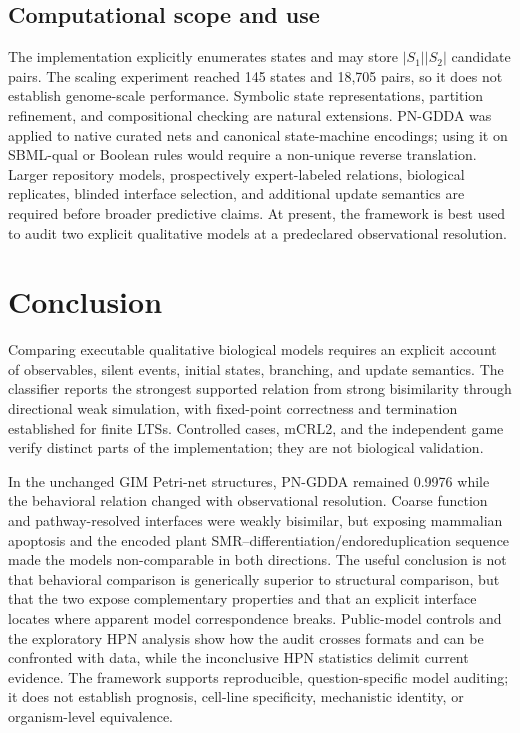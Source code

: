 \documentclass{ws-jbcb}
\numberwithin{equation}{section}
\begin{document}
\subsection{Computational scope and use}
\label{sec:discussion-computation}

The implementation explicitly enumerates states and may store
$|S_1||S_2|$ candidate pairs. The scaling experiment reached 145 states and
18,705 pairs, so it does not establish genome-scale performance. Symbolic state
representations, partition refinement, and compositional checking are natural
extensions. PN-GDDA was applied to native curated nets and canonical
state-machine encodings; using it on SBML-qual or Boolean rules would require a
non-unique reverse translation. Larger repository models, prospectively
expert-labeled relations, biological replicates, blinded interface selection,
and additional update semantics are required before broader predictive claims.
At present, the framework is best used to audit two explicit qualitative models
at a predeclared observational resolution.

\section{Conclusion}\label{sec:conclusion}

Comparing executable qualitative biological models requires an explicit account
of observables, silent events, initial states, branching, and update semantics.
The classifier reports the strongest supported relation from strong
bisimilarity through directional weak simulation, with fixed-point correctness
and termination established for finite LTSs. Controlled cases, mCRL2, and the
independent game verify distinct parts of the implementation; they are not
biological validation.

In the unchanged GIM Petri-net structures, PN-GDDA remained 0.9976 while the
behavioral relation changed with observational resolution. Coarse function and
pathway-resolved interfaces were weakly bisimilar, but exposing mammalian
apoptosis and the encoded plant SMR--differentiation/endoreduplication sequence
made the models non-comparable in both directions. The useful conclusion is not
that behavioral comparison is generically superior to structural comparison,
but that the two expose complementary properties and that an explicit interface
locates where apparent model correspondence breaks. Public-model controls and
the exploratory HPN analysis show how the audit crosses formats and can be
confronted with data, while the inconclusive HPN statistics delimit current
evidence. The framework supports reproducible, question-specific model auditing;
it does not establish prognosis, cell-line specificity, mechanistic identity, or
organism-level equivalence.
\end{document}
